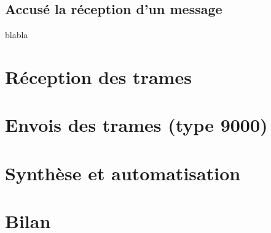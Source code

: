 \documentclass[a4paper,11pt]{article}
\begin{document}
	\subsection{Accusé la réception d'un message}
	blabla
	\section{Réception des trames}
	\section{Envois des trames (type 9000)}
	\section{Synthèse et automatisation}
	\section{Bilan}
\end{document}
